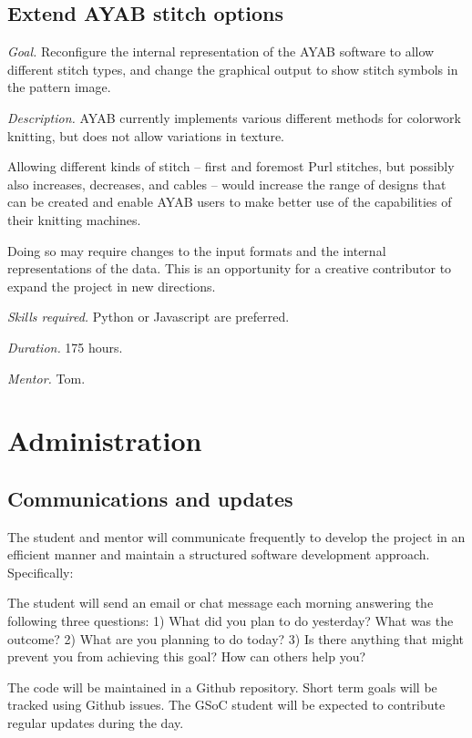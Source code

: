 \documentclass{article}
\begin{document}
\subsection{Extend AYAB stitch options} 

\textit{Goal.} Reconfigure the internal representation of the AYAB software to allow different stitch types, and change the graphical output to show stitch symbols in the pattern image.

\textit{Description.} AYAB currently implements various different methods for colorwork knitting, but does not allow variations in texture. 

Allowing different kinds of stitch -- first and foremost Purl stitches, but possibly also increases, decreases, and cables -- would increase the range of designs that can be created and enable AYAB users to make better use of the capabilities of their knitting machines. 

Doing so may require changes to the input formats and the internal representations of the data. This is an opportunity for a creative contributor to expand the project in new directions.

\textit{Skills required.} Python or Javascript are preferred.

\textit{Duration.} 175 hours. 

\textit{Mentor.} Tom.


\section{Administration}

\subsection{Communications and updates}

The student and mentor will communicate frequently to develop the project in an efficient manner and
maintain a structured software development approach. Specifically:

The student will send an email or chat message each morning answering the following three questions:
1) What did you plan to do yesterday? What was the outcome?
2) What are you planning to do today?
3) Is there anything that might prevent you from achieving this goal? How can others help
you?

The code will be maintained in a Github repository. Short term goals will be tracked using Github issues. The GSoC student will be expected to contribute regular updates during the day.
\end{document}
